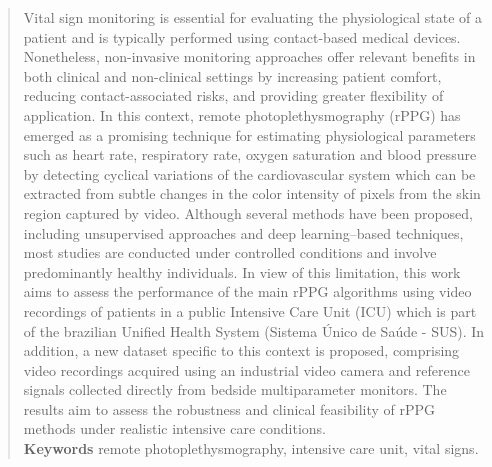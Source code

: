 \documentclass[]{politex}
\begin{document}
\begin{abstract}
Vital sign monitoring is essential for evaluating the physiological state of a patient and is typically performed using contact-based medical devices. Nonetheless, non-invasive monitoring approaches offer relevant benefits in both clinical and non-clinical settings by increasing patient comfort, reducing contact-associated risks, and providing greater flexibility of application. In this context, remote photoplethysmography (rPPG) has emerged as a promising technique for estimating physiological parameters such as heart rate, respiratory rate, oxygen saturation and blood pressure by detecting cyclical variations of the cardiovascular system which can be extracted from subtle changes in the color intensity of pixels from the skin region captured by video. Although several methods have been proposed, including unsupervised approaches and deep learning–based techniques, most studies are conducted under controlled conditions and involve predominantly healthy individuals. In view of this limitation, this work aims to assess the performance of the main rPPG algorithms using video recordings of patients in a public Intensive Care Unit (ICU) which is part of the brazilian Unified Health System (Sistema Único de Saúde - SUS). In addition, a new dataset specific to this context is proposed, comprising video recordings acquired using an industrial video camera and reference signals collected directly from bedside multiparameter monitors. The results aim to assess the robustness and clinical feasibility of rPPG methods under realistic intensive care conditions. 
%
\\[3\baselineskip]
%
\textbf{Keywords} remote photoplethysmography, intensive care unit, vital signs.
\end{abstract}

\listadefiguras
\listadetabelas


\sumario


\newpage

\newpage

\newpage

\newpage	
\end{document}
